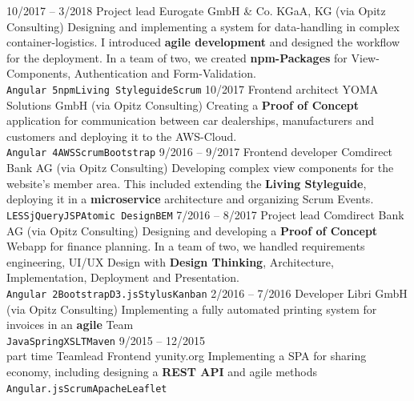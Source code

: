 \documentclass[9pt]{developercv} %
\begin{document}
\begin{entrylist}
{    }
  \entry
		{10/2017 -- 3/2018}
		{Project lead}
		{Eurogate GmbH \& Co. KGaA, KG (via Opitz Consulting)}
		{
      Designing and implementing a system for data-handling in complex container-logistics. I introduced \textbf{agile development} and designed
      the workflow for the deployment. In a team of two, we created \textbf{npm-Packages} for View-Components, Authentication and Form-Validation.\\ 
      \texttt{Angular 5}\slashsep\texttt{npm}\slashsep\texttt{Living Styleguide}\slashsep\texttt{Scrum}
    }
  \entry
		{10/2017}
		{Frontend architect}
		{YOMA Solutions GmbH (via Opitz Consulting)}
		{
      Creating a \textbf{Proof of Concept} application for communication between car dealerships, manufacturers and customers and
      deploying it to the AWS-Cloud.\\
      \texttt{Angular 4}\slashsep\texttt{AWS}\slashsep\texttt{Scrum}\slashsep\texttt{Bootstrap}
    }
  \entry
		{9/2016 -- 9/2017}
		{Frontend developer}
		{Comdirect Bank AG (via Opitz Consulting)}
		{
      Developing complex view components for the website's member area. This included extending the \textbf{Living Styleguide},
      deploying it in a \textbf{microservice} architecture and organizing Scrum Events.\\
      \texttt{LESS}\slashsep\texttt{jQuery}\slashsep\texttt{JSP}\slashsep\texttt{Atomic Design}\slashsep\texttt{BEM}
    }
  \entry
		{7/2016 -- 8/2017}
		{Project lead}
		{Comdirect Bank AG (via Opitz Consulting)}
		{
      Designing and developing a \textbf{Proof of Concept} Webapp for finance planning. In a team of two, we handled
      requirements engineering, UI/UX Design with \textbf{Design Thinking}, Architecture, Implementation, Deployment
      and Presentation.\\
      \texttt{Angular 2}\slashsep\texttt{Bootstrap}\slashsep\texttt{D3.js}\slashsep\texttt{Stylus}\slashsep\texttt{Kanban}
    }
  \entry
		{2/2016 -- 7/2016}
		{Developer}
		{Libri GmbH (via Opitz Consulting)}
		{
      Implementing a fully automated printing system for invoices in an \textbf{agile} Team\\
      \texttt{Java}\slashsep\texttt{Spring}\slashsep\texttt{XSLT}\slashsep\texttt{Maven}
    }
  \entry
		{9/2015 -- 12/2015\\\footnotesize{part time}}
		{Teamlead Frontend}
		{yunity.org}
		{
      Implementing a SPA for sharing economy, including designing a \textbf{REST API} and agile methods\\
      \texttt{Angular.js}\slashsep\texttt{Scrum}\slashsep\texttt{Apache}\slashsep\texttt{Leaflet}
}
\end{entrylist}
\end{document}
